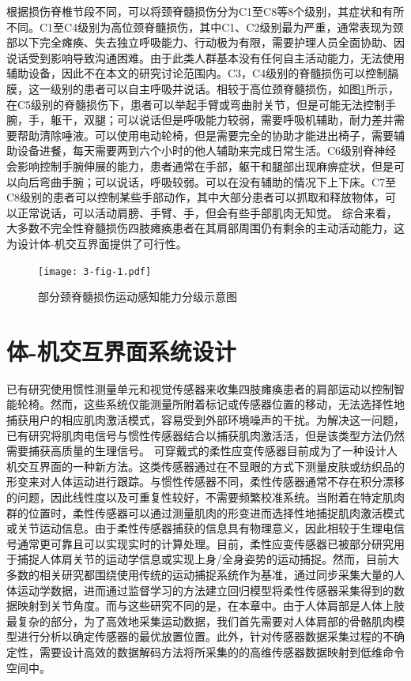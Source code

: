根据损伤脊椎节段不同，可以将颈脊髓损伤分为C1至C8等8个级别，其症状和有所不同。C1至C4级别为高位颈脊髓损伤，其中C1、C2级别最为严重，通常表现为颈部以下完全瘫痪、失去独立呼吸能力、行动极为有限，需要护理人员全面协助、因说话受到影响导致沟通困难。由于此类人群基本没有任何自主活动能力，无法使用辅助设备，因此不在本文的研究讨论范围内。C3，C4级别的脊髓损伤可以控制膈膜，这一级别的患者可以自主呼吸并说话。相较于高位颈脊髓损伤，如图\ref{3-fig-1}所示，在C5级别的脊髓损伤下，患者可以举起手臂或弯曲肘关节，但是可能无法控制手腕，手，躯干，双腿；可以说话但是呼吸能力较弱，需要呼吸机辅助，耐力差并需要帮助清除唾液。可以使用电动轮椅，但是需要完全的协助才能进出椅子，需要辅助设备进餐，每天需要两到六个小时的他人辅助来完成日常生活。C6级别脊神经会影响控制手腕伸展的能力，患者通常在手部，躯干和腿部出现麻痹症状，但是可以向后弯曲手腕；可以说话，呼吸较弱。可以在没有辅助的情况下上下床。C7至C8级别的患者可以控制某些手部动作，其中大部分患者可以抓取和释放物体，可以正常说话，可以活动肩膀、手臂、手，但会有些手部肌肉无知觉。
综合来看，大多数不完全性脊髓损伤四肢瘫痪患者在其肩部周围仍有剩余的主动活动能力\cite{shefflerNeuromuscularElectricalStimulation2007}，这为设计体-机交互界面提供了可行性。

\begin{figure}[!t]
    \centering
    \texttt{[image: 3-fig-1.pdf]}
    \caption{部分颈脊髓损伤运动感知能力分级示意图}
    \label{3-fig-1}
\end{figure}     

\section{体-机交互界面系统设计} 
已有研究使用惯性测量单元和视觉传感器来收集四肢瘫痪患者的肩部运动以控制智能轮椅\cite{thorpUpperBodyBasedPower2016d,seanez-gonzalezCursorControlKalman2014}。然而，这些系统仅能测量所附着标记或传感器位置的移动，无法选择性地捕获用户的相应肌肉激活模式，容易受到外部环境噪声的干扰。为解决这一问题，已有研究将肌肉电信号与惯性传感器结合以捕获肌肉激活活\cite{rizzoglioHybridBodyMachineInterface2020}，但是该类型方法仍然需要捕获高质量的生理信号。
可穿戴式的柔性应变传感器目前成为了一种设计人机交互界面的一种新方法\cite{dongStretchableHumanMachine2020}。这类传感器通过在不显眼的方式下测量皮肤或纺织品的形变来对人体运动进行跟踪。与惯性传感器不同，柔性传感器通常不存在积分漂移的问题，因此线性度以及可重复性较好，不需要频繁校准系统。当附着在特定肌肉群的位置时，柔性传感器可以通过测量肌肉的形变进而选择性地捕捉肌肉激活模式或关节运动信息。由于柔性传感器捕获的信息具有物理意义，因此相较于生理电信号通常更可靠且可以实现实时的计算处理。目前，柔性应变传感器已被部分研究用于捕捉人体肩关节的运动学信息\cite{jinSoftSensingShirt2020,leePrintableSkinAdhesive2016,samper-escuderoEfficientMultiaxialShoulderMotion2020}或实现上身/全身姿势的运动捕捉\cite{contreras-gonzalezEfficientUpperLimb2020,ogataEstimatingMovementsHuman2019,kimDeepFullBodyMotion2019}。然而，目前大多数的相关研究都围绕使用传统的运动捕捉系统作为基准，通过同步采集大量的人体运动学数据，进而通过监督学习的方法建立回归模型将柔性传感器采集得到的数据映射到关节角度。而与这些研究不同的是，在本章中。由于人体肩部是人体上肢最复杂的部分，为了高效地采集运动数据，我们首先需要对人体肩部的骨骼肌肉模型进行分析以确定传感器的最优放置位置。此外，针对传感器数据采集过程的不确定性，需要设计高效的数据解码方法将所采集的的高维传感器数据映射到低维命令空间中。  


